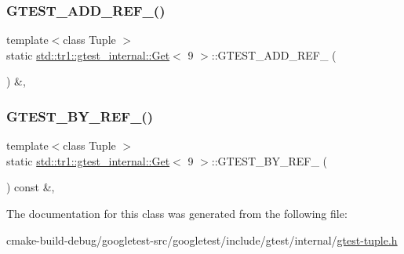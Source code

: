 \subsubsection{\texorpdfstring{GTEST\_ADD\_REF\_()}{GTEST\_ADD\_REF\_()}}
{\footnotesize\ttfamily template$<$class Tuple $>$ \\
static \mbox{\hyperlink{classstd_1_1tr1_1_1gtest__internal_1_1Get}{std\+::tr1\+::gtest\+\_\+internal\+::\+Get}}$<$ 9 $>$\+::G\+T\+E\+S\+T\+\_\+\+A\+D\+D\+\_\+\+R\+E\+F\+\_\+ (\begin{DoxyParamCaption}\item[{\mbox{\hyperlink{gtest-tuple_8h_a1b7f133d8aa02e0b7afed7b66781eeb7}{G\+T\+E\+S\+T\+\_\+\+T\+U\+P\+L\+E\+\_\+\+E\+L\+E\+M\+E\+N\+T\+\_\+}}(9, Tuple)}]{ }\end{DoxyParamCaption}) \&\hspace{0.3cm}{\ttfamily [inline]}, {\ttfamily [static]}}

\mbox{\label{classstd_1_1tr1_1_1gtest__internal_1_1Get_3_019_01_4_a5205e8da729e2bee446f5be0c65390af}} 
\subsubsection{\texorpdfstring{GTEST\_BY\_REF\_()}{GTEST\_BY\_REF\_()}}
{\footnotesize\ttfamily template$<$class Tuple $>$ \\
static \mbox{\hyperlink{classstd_1_1tr1_1_1gtest__internal_1_1Get}{std\+::tr1\+::gtest\+\_\+internal\+::\+Get}}$<$ 9 $>$\+::G\+T\+E\+S\+T\+\_\+\+B\+Y\+\_\+\+R\+E\+F\+\_\+ (\begin{DoxyParamCaption}\item[{\mbox{\hyperlink{gtest-tuple_8h_a1b7f133d8aa02e0b7afed7b66781eeb7}{G\+T\+E\+S\+T\+\_\+\+T\+U\+P\+L\+E\+\_\+\+E\+L\+E\+M\+E\+N\+T\+\_\+}}(9, Tuple)}]{ }\end{DoxyParamCaption}) const \&\hspace{0.3cm}{\ttfamily [inline]}, {\ttfamily [static]}}



The documentation for this class was generated from the following file\+:\begin{DoxyCompactItemize}
\item 
cmake-\/build-\/debug/googletest-\/src/googletest/include/gtest/internal/\mbox{\hyperlink{gtest-tuple_8h}{gtest-\/tuple.\+h}}\end{DoxyCompactItemize}

